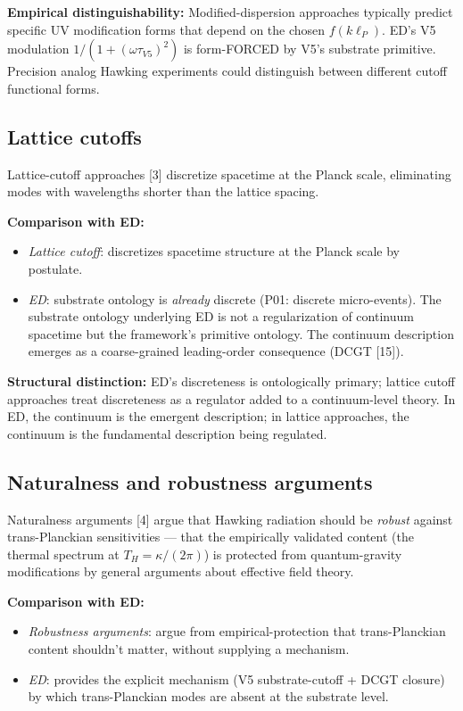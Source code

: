 \documentclass[11pt,a4paper]{article}
\begin{document}
\textbf{Empirical distinguishability:} Modified-dispersion approaches typically predict specific UV modification forms that depend on the chosen $f(k\ell_P)$. ED's V5 modulation $1/(1+(\omega\tau_{V5})^{2})$ is form-FORCED by V5's substrate primitive. Precision analog Hawking experiments could distinguish between different cutoff functional forms.

\subsection{Lattice cutoffs}

Lattice-cutoff approaches [3] discretize spacetime at the Planck scale, eliminating modes with wavelengths shorter than the lattice spacing.

\textbf{Comparison with ED:}
\begin{itemize}[noitemsep]
\item \emph{Lattice cutoff}: discretizes spacetime structure at the Planck scale by postulate.
\item \emph{ED}: substrate ontology is \emph{already} discrete (P01: discrete micro-events). The substrate ontology underlying ED is not a regularization of continuum spacetime but the framework's primitive ontology. The continuum description emerges as a coarse-grained leading-order consequence (DCGT [15]).
\end{itemize}

\textbf{Structural distinction:} ED's discreteness is ontologically primary; lattice cutoff approaches treat discreteness as a regulator added to a continuum-level theory. In ED, the continuum is the emergent description; in lattice approaches, the continuum is the fundamental description being regulated.

\subsection{Naturalness and robustness arguments}

Naturalness arguments [4] argue that Hawking radiation should be \emph{robust} against trans-Planckian sensitivities --- that the empirically validated content (the thermal spectrum at $T_H = \kappa/(2\pi)$) is protected from quantum-gravity modifications by general arguments about effective field theory.

\textbf{Comparison with ED:}
\begin{itemize}[noitemsep]
\item \emph{Robustness arguments}: argue from empirical-protection that trans-Planckian content shouldn't matter, without supplying a mechanism.
\item \emph{ED}: provides the explicit mechanism (V5 substrate-cutoff + DCGT closure) by which trans-Planckian modes are absent at the substrate level.
\end{itemize}
\end{document}
